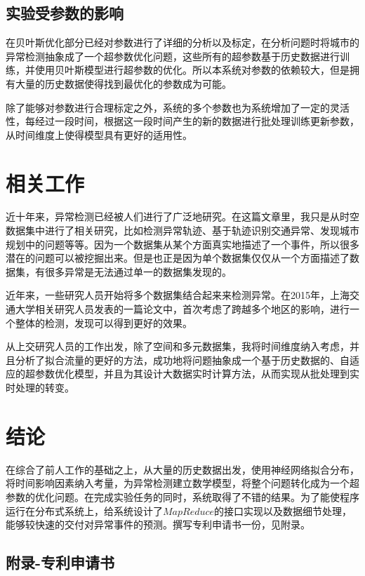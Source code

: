 \documentclass[a4paper, UTF8]{article}
\begin{document}
\begin{CJK}{UTF8}{gbsn}
\subsection{实验受参数的影响}
在贝叶斯优化部分已经对参数进行了详细的分析以及标定，在分析问题时将城市的异常检测抽象成了一个超参数优化问题，这些所有的超参数基于历史数据进行训练，并使用贝叶斯模型进行超参数的优化。所以本系统对参数的依赖较大，但是拥有大量的历史数据使得找到最优化的参数成为可能。
\par 除了能够对参数进行合理标定之外，系统的多个参数也为系统增加了一定的灵活性，每经过一段时间，根据这一段时间产生的新的数据进行批处理训练更新参数，从时间维度上使得模型具有更好的适用性。
\section{相关工作}
近十年来，异常检测已经被人们进行了广泛地研究\cite{Chandola2009Anomaly}。在这篇文章里，我只是从时空数据集中进行了相关研究，比如检测异常轨迹\cite{LeeTrajectory}、基于轨迹识别交通异常、发现城市规划中的问题等等\cite{Wei2011Discovering}。因为一个数据集从某个方面真实地描述了一个事件，所以很多潜在的问题可以被挖掘出来。但是也正是因为单个数据集仅仅从一个方面描述了数据集，有很多异常是无法通过单一的数据集发现的。
\par 近年来，一些研究人员开始将多个数据集结合起来来检测异常。在2015年，上海交通大学相关研究人员发表的一篇论文中\cite{DalzielDetecting}，首次考虑了跨越多个地区的影响，进行一个整体的检测，发现可以得到更好的效果。
\par 从上交研究人员的工作出发，除了空间和多元数据集，我将时间维度纳入考虑，并且分析了拟合流量的更好的方法，成功地将问题抽象成一个基于历史数据的、自适应的超参数优化模型，并且为其设计大数据实时计算方法，从而实现从批处理到实时处理的转变。
\section{结论}
在综合了前人工作的基础之上，从大量的历史数据出发，使用神经网络拟合分布，将时间影响因素纳入考量，为异常检测建立数学模型，将整个问题转化成为一个超参数的优化问题。在完成实验任务的同时，系统取得了不错的结果。为了能使程序运行在分布式系统上，给系统设计了$MapReduce$的接口实现以及数据细节处理，能够较快速的交付对异常事件的预测。撰写专利申请书一份，见附录。


\newpage
\begin{appendix}
\section*{附录-专利申请书}

\end{appendix}
\end{CJK}
\end{document}

